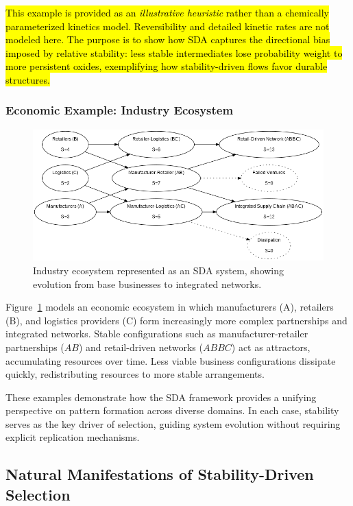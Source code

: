 \documentclass[preprint,12pt]{elsarticle}
\newcommand{\added}[1]{\hl{#1}}
\begin{document}
\added{This example is provided as an \emph{illustrative heuristic} rather than a chemically parameterized kinetics model. Reversibility and detailed kinetic rates are not modeled here. The purpose is to show how SDA captures the directional bias imposed by relative stability: less stable intermediates lose probability weight to more persistent oxides, exemplifying how stability-driven flows favor durable structures.}


\subsubsection{Economic Example: Industry Ecosystem}

\begin{figure}[h]
    \centering
    \includegraphics[width=1\textwidth]{figure_14.png}
    \caption{Industry ecosystem represented as an SDA system, showing evolution from base businesses to integrated networks.}
    \label{fig:figure_14}
\end{figure}

Figure~\ref{fig:figure_14} models an economic ecosystem in which manufacturers (A), retailers (B), and logistics providers (C) form increasingly more complex partnerships and integrated networks. Stable configurations such as manufacturer-retailer partnerships (\( AB \)) and retail-driven networks (\( ABBC \)) act as attractors, accumulating resources over time. Less viable business configurations dissipate quickly, redistributing resources to more stable arrangements.

These examples demonstrate how the SDA framework provides a unifying perspective on pattern formation across diverse domains. In each case, stability serves as the key driver of selection, guiding system evolution without requiring explicit replication mechanisms.

\subsection{Natural Manifestations of Stability-Driven Selection}
\end{document}
